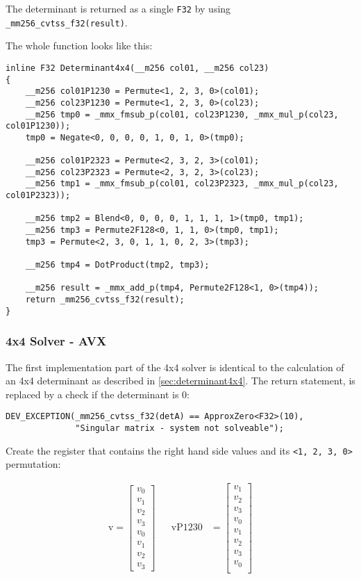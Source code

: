 \documentclass[]{scrartcl}
\begin{document}
The determinant is returned as a single \texttt{F32} by using \texttt{_mm256_cvtss_f32(result)}.

The whole function looks like this:
\begin{verbatim}
inline F32 Determinant4x4(__m256 col01, __m256 col23)
{
    __m256 col01P1230 = Permute<1, 2, 3, 0>(col01);
    __m256 col23P1230 = Permute<1, 2, 3, 0>(col23);
    __m256 tmp0 = _mmx_fmsub_p(col01, col23P1230, _mmx_mul_p(col23, col01P1230));
    tmp0 = Negate<0, 0, 0, 0, 1, 0, 1, 0>(tmp0);

    __m256 col01P2323 = Permute<2, 3, 2, 3>(col01);
    __m256 col23P2323 = Permute<2, 3, 2, 3>(col23);
    __m256 tmp1 = _mmx_fmsub_p(col01, col23P2323, _mmx_mul_p(col23, col01P2323));

    __m256 tmp2 = Blend<0, 0, 0, 0, 1, 1, 1, 1>(tmp0, tmp1);
    __m256 tmp3 = Permute2F128<0, 1, 1, 0>(tmp0, tmp1);
    tmp3 = Permute<2, 3, 0, 1, 1, 0, 2, 3>(tmp3);

    __m256 tmp4 = DotProduct(tmp2, tmp3);

    __m256 result = _mmx_add_p(tmp4, Permute2F128<1, 0>(tmp4));
    return _mm256_cvtss_f32(result);
}
\end{verbatim}

\subsubsection{4x4 Solver - AVX}

The first implementation part of the 4x4 solver is identical to the calculation of an 4x4 determinant as described in \cref{sec:determinant4x4}. The return statement, is replaced by a check if the determinant is 0:
\begin{verbatim}
DEV_EXCEPTION(_mm256_cvtss_f32(detA) == ApproxZero<F32>(10), 
              "Singular matrix - system not solveable");
\end{verbatim} 

Create the register that contains the right hand side values and its 
\texttt{<1, 2, 3, 0>} permutation:

\begin{align*}
\mathrm{v} 
=
\begin{bmatrix}
v_0\\
v_1\\
v_2\\
v_3\\
v_0\\
v_1\\
v_2\\
v_3
\end{bmatrix}
&&
\mathrm{vP1230} 
&=
\begin{bmatrix}
v_1\\
v_2\\
v_3\\
v_0\\
v_1\\
v_2\\
v_3\\
v_0\\
\end{bmatrix}
\end{align*}
\end{document}
